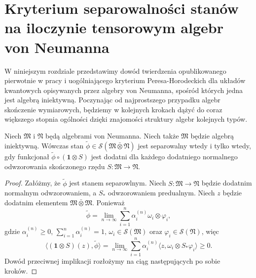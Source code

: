 \chapter{Kryterium separowalności stanów na iloczynie tensorowym
algebr von Neumanna}
\label{chp:PHcrit}

W niniejszym rozdziale przedstawimy dowód twierdzenia
opublikowanego pierwotnie w pracy
\cite{miller2014horodeckis}
i uogólniającego kryterium Peresa-Horodeckich dla układów
kwantowych opisywanych przez algebry von Neumanna,
spośród których jedna jest algebrą iniektywną.
Poczynając od najprostszego przypadku algebr skończenie wymiarowych,
będziemy w kolejnych krokach dążyć do coraz większego stopnia
ogólności dzięki znajomości struktury algebr kolejnych typów.

\begin{Theorem}
    \label{thm:PHcrit}
    Niech $\mathfrak{M}$ i  $\mathfrak{N}$ będą algebrami von Neumanna.
    Niech także  $\mathfrak{M}$ będzie algebrą iniektywną.
    Wówczas stan $\tilde{\phi} \in \mathcal{S}(\mathfrak{M} \bar{\otimes} \mathfrak{N})$
    jest separowalny wtedy i tylko wtedy, gdy funkcjonał
    $\tilde{\phi} \circ (\mathbf{1} \otimes S)$
    jest dodatni dla każdego dodatniego normalnego odwzorowania skończonego rzędu
    $S\!: \mathfrak{M} \rightarrow \mathfrak{N}$.
\end{Theorem}

\begin{proof}


Załóżmy, że $\tilde{\phi}$ jest stanem separowlnym.
Niech $S: \mathfrak{M} \rightarrow \mathfrak{N}$ będzie
dodatnim normalnym odwzorowaniem, a $S_*$ odwzorowaniem predualnym.
Niech $z$ będzie dodatnim elementem
$\mathfrak{M} \bar{\otimes} \mathfrak{M}$.
Ponieważ
\begin{equation}
    \tilde{\phi} =\lim \limits_{n \rightarrow \infty}
\sum_{i=1}^{n}\alpha_i^{(n)} \omega_{i} \otimes \varphi_{i},
\end{equation}
gdzie
$\alpha_i^{(n)}\geq 0$, $\sum_{i=1}^n\alpha_i^{(n)}=1$,
$\omega_{i}\in\mathcal{S}(\mathfrak{M})$
oraz
$\varphi_{i}\in\mathcal{S}(\mathfrak{N})$,
więc
\begin{equation}
 \langle (\mathbf{1} \otimes S)(z), \tilde{\phi} \rangle =
 \lim \limits_{n \rightarrow \infty}\sum \limits_{i = 1}^{n}\alpha_i^{(n)}
 \langle z, \omega_{i} \otimes S_{*} \varphi_{i} \rangle \geq 0.
\end{equation}
Dowód przeciwnej implikacji rozłożymy na ciąg następujących po sobie kroków.
\end{proof}

